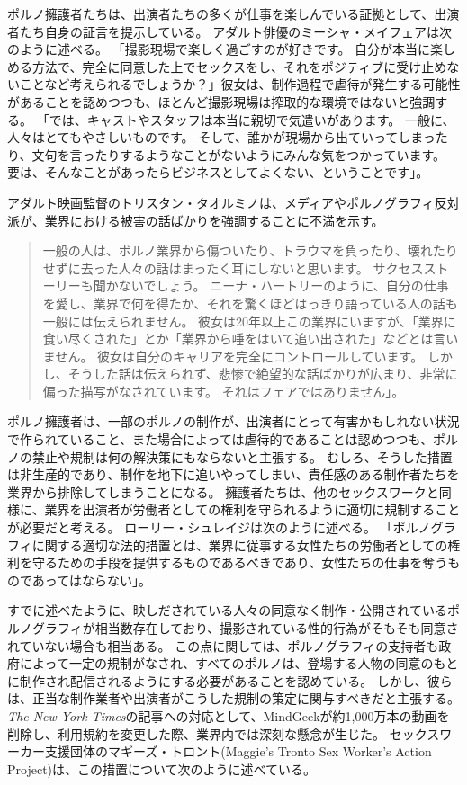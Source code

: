 \documentclass[paper=a4,book,openany]{jlreq}
\begin{document}
ポルノ擁護者たちは、出演者たちの多くが仕事を楽しんでいる証拠として、出演者たち自身の証言を提示している。
アダルト俳優のミーシャ・メイフェアは次のように述べる。
「撮影現場で楽しく過ごすのが好きです。
自分が本当に楽しめる方法で、完全に同意した上でセックスをし、それをポジティブに受け止めないことなど考えられるでしょうか？」彼女は、制作過程で虐待が発生する可能性があることを認めつつも、ほとんど撮影現場は搾取的な環境ではないと強調する。
「では、キャストやスタッフは本当に親切で気遣いがあります。
一般に、人々はとてもやさしいものです。
そして、誰かが現場から出ていってしまったり、文句を言ったりするようなことがないようにみんな気をつかっています。
要は、そんなことがあったらビジネスとしてよくない、ということです」\citep{sisley19:_common_myths_porn_debun_porn_perfor}。

アダルト映画監督のトリスタン・タオルミノは、メディアやポルノグラフィ反対派が、業界における被害の話ばかりを強調することに不満を示す。

\begin{quote}
一般の人は、ポルノ業界から傷ついたり、トラウマを負ったり、壊れたりせずに去った人々の話はまったく耳にしないと思います。
サクセスストーリーも聞かないでしょう。
ニーナ・ハートリーのように、自分の仕事を愛し、業界で何を得たか、それを驚くほどはっきり語っている人の話も一般には伝えられません。
彼女は20年以上この業界にいますが、「業界に食い尽くされた」とか「業界から唾をはいて追い出された」などとは言いません。
彼女は自分のキャリアを完全にコントロールしています。
しかし、そうした話は伝えられず、悲惨で絶望的な話ばかりが広まり、非常に偏った描写がなされています。
それはフェアではありません」。
\citep{sachs12:_inter_femin_pornog}
\end{quote}

ポルノ擁護者は、一部のポルノの制作が、出演者にとって有害かもしれない状況で作られていること、また場合によっては虐待的であることは認めつつも、ポルノの禁止や規制は何の解決策にもならないと主張する。
むしろ、そうした措置は非生産的であり、制作を地下に追いやってしまい、責任感のある制作者たちを業界から排除してしまうことになる。
擁護者たちは、他のセックスワークと同様に、業界を出演者が労働者としての権利を守られるように適切に規制することが必要だと考える。
ローリー・シュレイジは次のように述べる。
「ポルノグラフィに関する適切な法的措置とは、業界に従事する女性たちの労働者としての権利を守るための手段を提供するものであるべきであり、女性たちの仕事を奪うものであってはならない」\citep[p.58]{shrage05:_expos_fallac_anti_femin}。

すでに述べたように、映しだされている人々の同意なく制作・公開されているポルノグラフィが相当数存在しており、撮影されている性的行為がそもそも同意されていない場合も相当ある。
この点に関しては、ポルノグラフィの支持者も政府によって一定の規制がなされ、すべてのポルノは、登場する人物の同意のもとに制作され配信されるようにする必要があることを認めている。
しかし、彼らは、正当な制作業者や出演者がこうした規制の策定に関与すべきだと主張する。
\emph{The New York Times}の記事への対応として、MindGeekが約1,000万本の動画を削除し、利用規約を変更した際、業界内では深刻な懸念が生じた。
セックスワーカー支援団体のマギーズ・トロント(Maggie's Tronto Sex Worker's Action Project)は、この措置について次のように述べている。
\end{document}

